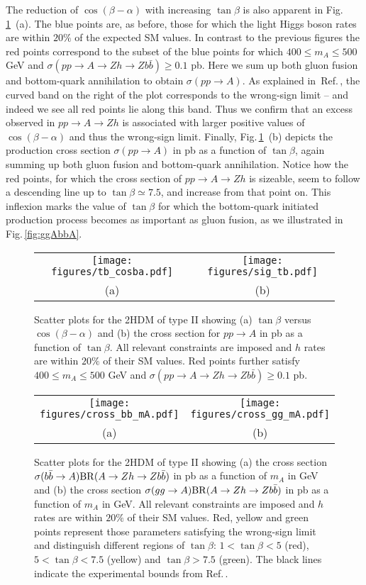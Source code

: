 \documentclass[12pt]{article}
\newcommand{\citere}[1]{Ref.\,\cite{#1}}
\newcommand{\abbrev}{\scalefont{.9}}
\newcommand{\fig}[1]{Fig.\,\ref{#1}}
\newcommand{\sm}{{\abbrev SM}}
\newcommand{\thdm}{{\abbrev 2HDM}}
\begin{document}
The reduction of $\cos(\beta-\alpha)$ with increasing $\tan\beta$ is also apparent in \fig{fig:ppAZh}~(a).
The blue points are, as before, those for which the light Higgs boson rates are within $20\%$ of the expected \sm{} values.
In contrast to the previous figures the red points correspond to the subset of the blue points
for which $400\leq m_A\leq 500$ GeV and $\sigma(pp\to A \to Zh \to Zb\bar{b}) \geq 0.1$ pb.
Here we sum up both gluon fusion and bottom-quark annihilation to obtain $\sigma(pp \to A)$.
As explained in~\citere{Ferreira:2014naa}, the curved band on the right of the plot corresponds to the wrong-sign limit
-- and indeed we see all red points lie along this band. Thus we confirm
that an excess observed in $pp\to A\to Zh$ is associated with larger positive values of $\cos(\beta - \alpha)$
and thus the wrong-sign limit.
Finally, \fig{fig:ppAZh}~(b) depicts the production cross section $\sigma(pp\to A)$ in pb
as a function of $\tan\beta$, again summing up both gluon fusion and bottom-quark annihilation.
Notice how the red points, for which the cross section of $pp\to A \to Zh$ is sizeable, seem to follow a descending line up
to $\tan\beta \simeq 7.5$, and increase from that point on. This inflexion marks the value of
$\tan\beta$ for which the bottom-quark initiated production process becomes as important as
gluon fusion, as we illustrated in \fig{fig:ggAbbA}.
%
\begin{figure}[t]
\begin{tabular}{cc}
\texttt{[image: figures/tb\_cosba.pdf]}&
\texttt{[image: figures/sig\_tb.pdf]}\\
 (a) & (b)
\end{tabular}
\caption{Scatter plots for the \thdm{} of type II showing
(a) $\tan\beta$ versus $\cos(\beta - \alpha)$ and
(b) the cross section for $pp\to A$ in pb as a function of $\tan\beta$.
All relevant constraints are imposed and $h$ rates are within $20\%$ of their \sm{} values.
Red points further satisfy $400\leq m_A\leq 500$ GeV and $\sigma(pp\to A \to Zh\to Zb\bar{b}) \geq 0.1$ pb.
}
\label{fig:ppAZh}
\end{figure}
%
\begin{figure}[t]
\begin{tabular}{cc}
\texttt{[image: figures/cross\_bb\_mA.pdf]}&
\texttt{[image: figures/cross\_gg\_mA.pdf]}\\
 (a) & (b)
\end{tabular}
\caption{Scatter plots for the \thdm{} of type II showing
(a) the cross section $\sigma(b\bar b\to A){\rm BR}(A\to Zh\to Z b\bar b)$ in pb as a function of $m_A$ in GeV and
(b) the cross section $\sigma(gg\to A){\rm BR}(A\to Zh\to Z b\bar b)$ in pb as a function of $m_A$ in GeV.
All relevant constraints are imposed and $h$ rates are within $20\%$ of their \sm{} values.
Red, yellow and green points represent those parameters satisfying the wrong-sign limit
and distinguish different regions of $\tan\beta$: $1<\tan\beta<5$ (red), $5<\tan\beta<7.5$ (yellow) and $\tan\beta>7.5$ (green).
The black lines indicate the experimental bounds from \citere{ATLAS:2017nxi}.
}
\label{fig:ggbbAZh}
\end{figure}
\end{document}
